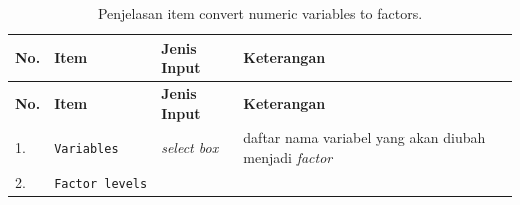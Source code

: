 \documentclass[12pt,]{krantz}
\begin{document}
\begin{longtable}[]{@{}llll@{}}
\caption{\label{tab:numtofac2} Penjelasan item convert numeric variables to factors.}\tabularnewline
\toprule
\begin{minipage}[b]{0.04\columnwidth}\raggedright
\textbf{No.}\strut
\end{minipage} & \begin{minipage}[b]{0.15\columnwidth}\raggedright
\textbf{Item}\strut
\end{minipage} & \begin{minipage}[b]{0.09\columnwidth}\raggedright
\textbf{Jenis Input}\strut
\end{minipage} & \begin{minipage}[b]{0.60\columnwidth}\raggedright
\textbf{Keterangan}\strut
\end{minipage}\tabularnewline
\midrule
\endfirsthead
\toprule
\begin{minipage}[b]{0.04\columnwidth}\raggedright
\textbf{No.}\strut
\end{minipage} & \begin{minipage}[b]{0.15\columnwidth}\raggedright
\textbf{Item}\strut
\end{minipage} & \begin{minipage}[b]{0.09\columnwidth}\raggedright
\textbf{Jenis Input}\strut
\end{minipage} & \begin{minipage}[b]{0.60\columnwidth}\raggedright
\textbf{Keterangan}\strut
\end{minipage}\tabularnewline
\midrule
\endhead
\begin{minipage}[t]{0.04\columnwidth}\raggedright
1.\strut
\end{minipage} & \begin{minipage}[t]{0.15\columnwidth}\raggedright
\texttt{Variables}\strut
\end{minipage} & \begin{minipage}[t]{0.09\columnwidth}\raggedright
\emph{select box}\strut
\end{minipage} & \begin{minipage}[t]{0.60\columnwidth}\raggedright
daftar nama variabel yang akan diubah menjadi \emph{factor}\strut
\end{minipage}\tabularnewline
\begin{minipage}[t]{0.04\columnwidth}\raggedright
2.\strut
\end{minipage} & \begin{minipage}[t]{0.15\columnwidth}\raggedright
\texttt{Factor\ levels}\strut

\end{minipage}
\end{longtable}
\end{document}
